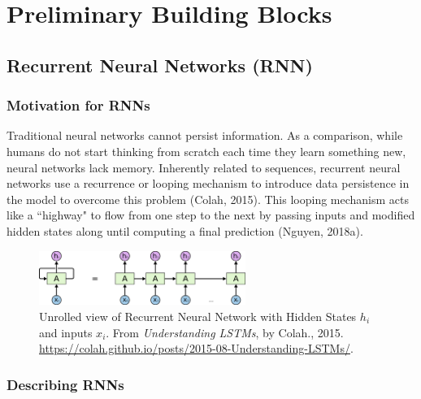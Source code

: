 \section{Preliminary Building Blocks} \label{Basics_RNN}

\subsection{Recurrent Neural Networks (RNN)}

\subsubsection{Motivation for RNNs}

Traditional neural networks cannot persist information. As a comparison, while humans do not start thinking from scratch each time they learn something new, neural networks lack memory. Inherently related to sequences, recurrent neural networks use a recurrence or looping mechanism to introduce data persistence in the model to overcome this problem (Colah, 2015). This looping mechanism acts like a ``highway" to flow from one step to the next by passing inputs and modified hidden states along until computing a final prediction (Nguyen, 2018a). 

\begin{figure}[h]
\vspace{-5pt}
\centering
\includegraphics[width=0.6\textwidth]{imgs/rnn_colah_unrolled.png}
\vspace{-5pt}
\caption{\footnotesize Unrolled view of Recurrent Neural Network with Hidden States $h_i$ and inputs $x_i$. From \emph{Understanding LSTMs}, by Colah., 2015. \url{https://colah.github.io/posts/2015-08-Understanding-LSTMs/}. }
\vspace{-5pt}
\end{figure}


\subsubsection{Describing RNNs}

